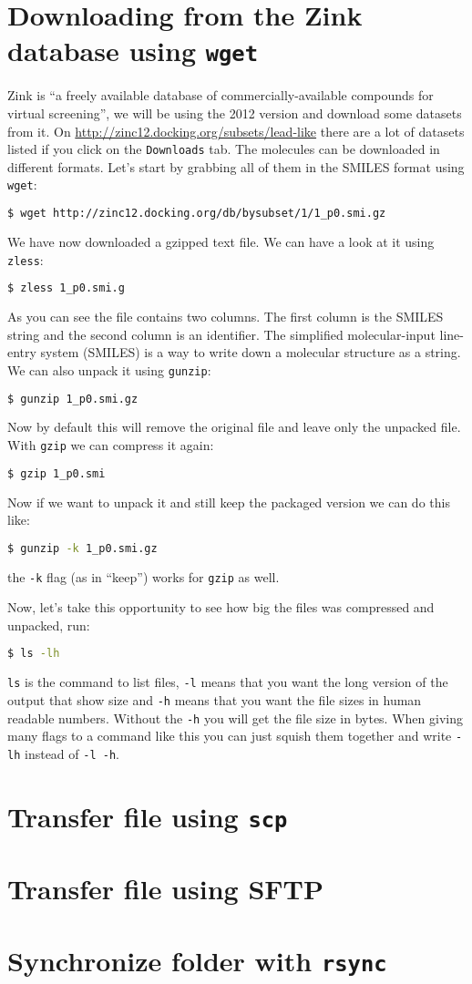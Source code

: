 \documentclass[watermark]{pbpreprint}
\begin{document}
\section{Downloading from the Zink database using \texttt{wget}}
Zink is ``a freely available database of commercially-available compounds for
virtual screening'', we will be using the 2012 version and download some
datasets from it. On \url{http://zinc12.docking.org/subsets/lead-like} there
are a lot of datasets listed if you click on the \texttt{Downloads} tab. The
molecules can be downloaded in different formats. Let's start by grabbing all
of them in the SMILES format using \texttt{wget}:
\begin{lstlisting}[language=bash]
$ wget http://zinc12.docking.org/db/bysubset/1/1_p0.smi.gz
\end{lstlisting}
We have now downloaded a gzipped text file. We can have a look at it using
\texttt{zless}:
\begin{lstlisting}[language=bash]
$ zless 1_p0.smi.g
\end{lstlisting}
As you can see the file contains two columns. The first column is the SMILES
string and the second column is an identifier. The simplified molecular-input
line-entry system (SMILES) is a way to write down a molecular structure as a
string. We can also unpack it using \texttt{gunzip}:
\begin{lstlisting}[language=bash]
$ gunzip 1_p0.smi.gz
\end{lstlisting}
Now by default this will remove the original file and leave only the unpacked
file. With \texttt{gzip} we can compress it again:
\begin{lstlisting}[language=bash]
$ gzip 1_p0.smi
\end{lstlisting}
Now if we want to unpack it and still keep the packaged version we can do this like:
\begin{lstlisting}[language=bash]
$ gunzip -k 1_p0.smi.gz
\end{lstlisting}
the \texttt{-k} flag (as in ``keep'') works for \texttt{gzip} as well. 

\vspace{1\baselineskip}
Now, let's take this opportunity to see how big the files was compressed and
unpacked, run: 
\begin{lstlisting}[language=bash]
$ ls -lh
\end{lstlisting}
\texttt{ls} is the command to list files, \texttt{-l} means that you want the
long version of the output that show size and \texttt{-h} means that you want
the file sizes in human readable numbers. Without the \texttt{-h} you will get
the file size in bytes. When giving many flags to a command like this you can
just squish them together and write \texttt{-lh} instead of \texttt{-l -h}.

\section{Transfer file using \texttt{scp}}

\section{Transfer file using SFTP}

\section{Synchronize folder with \texttt{rsync}}
\end{document}

